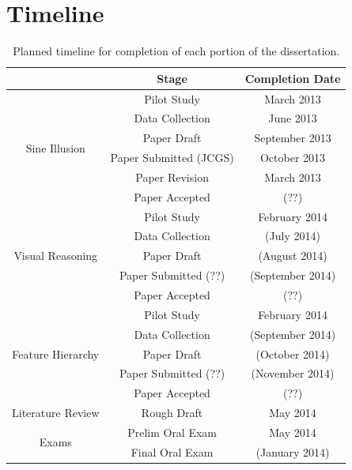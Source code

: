 \documentclass[11pt]{isuthesis}\usepackage[]{graphicx}\usepackage[]{color}
\begin{document}
\section{Timeline}
\begin{table}[htbp]\centering
\begin{tabular}{|c|c|c|}\hline
 & Stage & Completion Date\\\hline
\multirow{6}{*}{Sine Illusion} & Pilot Study & March 2013\\
 & Data Collection & June 2013\\
 & Paper Draft & September 2013\\
 & Paper Submitted (JCGS) & October 2013\\
 & Paper Revision & March 2013\\
 & Paper Accepted & (??)\\\hline
\multirow{5}{*}{Visual Reasoning} & Pilot Study & February 2014\\
 & Data Collection & (July 2014)\\
 & Paper Draft & (August 2014)\\
 & Paper Submitted (??) & (September 2014)\\
 & Paper Accepted & (??) \\\hline
\multirow{5}{*}{Feature Hierarchy} & Pilot Study & February 2014\\
 & Data Collection & (September 2014)\\
 & Paper Draft & (October 2014)\\
 & Paper Submitted (??) & (November 2014)\\
 & Paper Accepted & (??) \\\hline
Literature Review & Rough Draft & May 2014\\\hline
\multirow{2}{*}{Exams} & Prelim Oral Exam & May 2014 \\
 & Final Oral Exam & (January 2014)\\\hline
\end{tabular}
\caption{Planned timeline for completion of each portion of the dissertation.}
\end{table}
\end{document}
